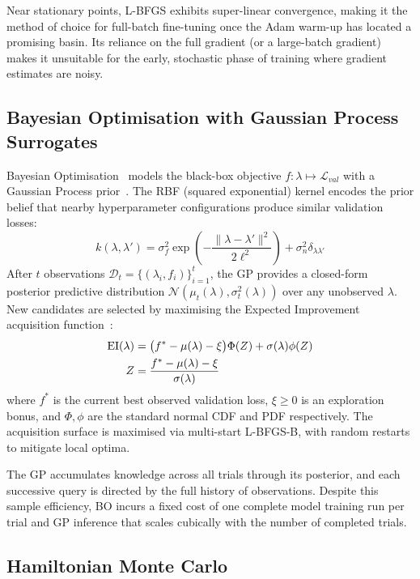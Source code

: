 \documentclass[12pt,a4paper]{article}
\begin{document}
Near stationary points, L-BFGS exhibits super-linear convergence,
making it the method of choice for full-batch fine-tuning once the
Adam warm-up has located a promising basin.  Its reliance on the full
gradient (or a large-batch gradient) makes it unsuitable for the
early, stochastic phase of training where gradient estimates are noisy.

\subsection{Bayesian Optimisation with Gaussian Process Surrogates}

Bayesian Optimisation~\cite{snoek2012} models the black-box objective
$f: \lambda \mapsto \mathcal{L}_{val}$ with a Gaussian Process
prior~\cite{rasmussen2006}.  The RBF (squared exponential) kernel
encodes the prior belief that nearby hyperparameter configurations
produce similar validation losses:
\begin{equation}
k(\lambda,\lambda') = \sigma_f^2\exp\!\left(-\frac{\|\lambda-\lambda'\|^2}{2\ell^2}\right)
+\sigma_n^2\delta_{\lambda\lambda'}
\label{eq:rbf}
\end{equation}
After $t$ observations $\mathcal{D}_t = \{(\lambda_i, f_i)\}_{i=1}^t$,
the GP provides a closed-form posterior predictive distribution
$\mathcal{N}(\mu_t(\lambda), \sigma_t^2(\lambda))$ over any
unobserved $\lambda$.  New candidates are selected by maximising the
Expected Improvement acquisition function~\cite{mockus1975}:
\begin{align}
\mathrm{EI}(\lambda) &=
  \bigl(f^*-\mu(\lambda)-\xi\bigr)\Phi(Z)
  +\sigma(\lambda)\phi(Z)
\label{eq:ei}\\
Z &= \frac{f^*-\mu(\lambda)-\xi}{\sigma(\lambda)} \notag
\end{align}
where $f^*$ is the current best observed validation loss,
$\xi \ge 0$ is an exploration bonus, and $\Phi, \phi$ are the
standard normal CDF and PDF respectively.  The acquisition surface is
maximised via multi-start L-BFGS-B, with random restarts to mitigate
local optima.

The GP accumulates knowledge across all trials through its posterior,
and each successive query is directed by the full history of
observations.  Despite this sample efficiency, BO incurs a fixed cost
of one complete model training run per trial and GP inference that
scales cubically with the number of completed trials.

\subsection{Hamiltonian Monte Carlo}
\end{document}
